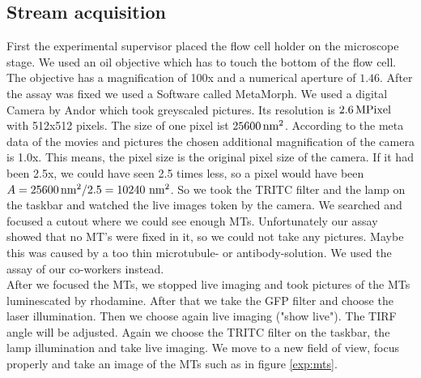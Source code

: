 	\subsection{Stream acquisition}
        First the experimental supervisor placed the flow cell holder on the microscope stage. We used an oil objective which has to touch the bottom of the flow cell. The objective has a magnification of 100x and a numerical aperture of $1.46$.  
        After the assay was fixed we used a Software called MetaMorph. We used a digital Camera by Andor which took greyscaled pictures. Its resolution is $\unit[2.6]{MPixel}$ with 512x512 pixels. The size of one pixel ist $\unit[25600]{nm^2}$.
        According to the meta data of the movies and pictures the chosen additional magnification of the camera is 1.0x. This means, the pixel size is the original pixel size of the camera. If it had been 2.5x, we could have seen 2.5 times less, so a pixel would have been $A = \unit[25600]{nm^2} / 2.5 = 10240\ \unit{nm^2}$. 
        So we took the TRITC filter and the lamp on the taskbar and watched the live images token by the camera. We searched and focused a cutout where we could see enough MTs. 
        Unfortunately our assay showed that no MT's were fixed in it, so we could not take any pictures. Maybe this was caused by a too thin microtubule- or antibody-solution. We used the assay of our co-workers instead.\\ 
        After we focused the MTs, we stopped live imaging and took pictures of the MTs luminescated by rhodamine. After that we take the GFP filter and choose the laser illumination. Then we choose again live imaging ("show live"). The TIRF angle will be adjusted.  %
        Again we choose the TRITC filter on the taskbar, the lamp illumination and take live imaging. We move to a new field of view, focus properly and take an image of the MTs such as in figure \ref{exp:mts}.\\
